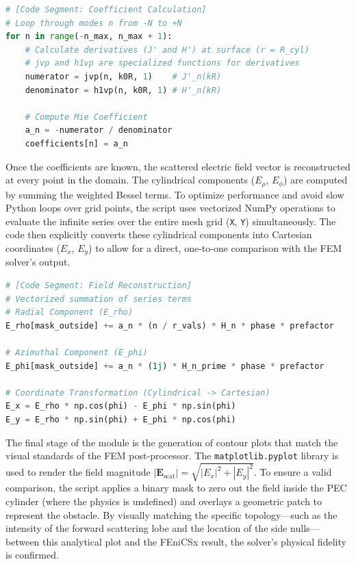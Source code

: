 \documentclass[class=report, crop=false]{standalone}
\begin{document}
\begin{lstlisting}[language=Python, caption={Coefficient Calculation}]
# [Code Segment: Coefficient Calculation]
# Loop through modes n from -N to +N
for n in range(-n_max, n_max + 1):
    # Calculate derivatives (J' and H') at surface (r = R_cyl)
    # jvp and h1vp are specialized functions for derivatives
    numerator = jvp(n, k0R, 1)    # J'_n(kR)
    denominator = h1vp(n, k0R, 1) # H'_n(kR)
    
    # Compute Mie Coefficient
    a_n = -numerator / denominator
    coefficients[n] = a_n
\end{lstlisting}

Once the coefficients are known, the scattered electric field vector is reconstructed at every point in the domain. The cylindrical components ($E_\rho$, $E_\phi$) are computed by summing the weighted Bessel terms. To optimize performance and avoid slow Python loops over grid points, the script uses vectorized NumPy operations to evaluate the infinite series over the entire mesh grid (\texttt{X}, \texttt{Y}) simultaneously. The code then explicitly converts these cylindrical components into Cartesian coordinates ($E_x$, $E_y$) to allow for a direct, one-to-one comparison with the FEM solver's output.

\begin{lstlisting}[language=Python, caption={Field Reconstruction}]
# [Code Segment: Field Reconstruction]
# Vectorized summation of series terms
# Radial Component (E_rho)
E_rho[mask_outside] += a_n * (n / r_vals) * H_n * phase * prefactor

# Azimuthal Component (E_phi)
E_phi[mask_outside] += a_n * (1j) * H_n_prime * phase * prefactor

# Coordinate Transformation (Cylindrical -> Cartesian)
E_x = E_rho * np.cos(phi) - E_phi * np.sin(phi)
E_y = E_rho * np.sin(phi) + E_phi * np.cos(phi)
\end{lstlisting}

The final stage of the module is the generation of contour plots that match the visual standards of the FEM post-processor. The \texttt{matplotlib.pyplot} library is used to render the field magnitude $|\bm{E}_{\text{scat}}| = \sqrt{|E_x|^2 + |E_y|^2}$. To ensure a valid comparison, the script applies a binary mask to zero out the field inside the PEC cylinder (where the physics is undefined) and overlays a geometric patch to represent the obstacle. By visually matching the specific topology---such as the intensity of the forward scattering lobe and the location of the side nulls---between this analytical plot and the FEniCSx result, the solver's physical fidelity is confirmed.
\end{document}
